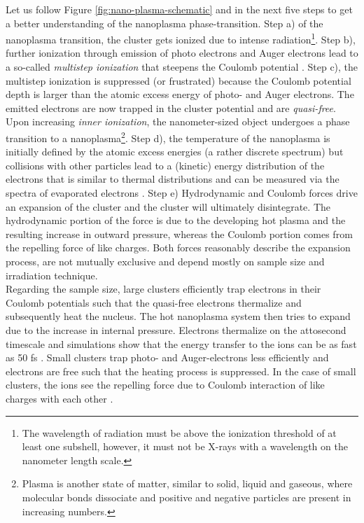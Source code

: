  Let us follow Figure \ref{fig:nano-plasma-schematic} and \citep{Arbeiter-2011-NJP,Bostedt-2010-JPB} in the next five steps to get a better understanding of the nanoplasma phase-transition. Step a) of the nanoplasma transition, the cluster gets ionized due to intense radiation\footnote{The wavelength of radiation must be above the ionization threshold of at least one subshell, however, it must not be X-rays with a wavelength on the nanometer length scale.}. Step b), further ionization through emission of photo electrons and Auger electrons lead to a so-called \textit{multistep ionization} that steepens the Coulomb potential \citep{Wabnitz-2002-Nature,Laarmann-2004-PRL,Bostedt-2008-PRL}. Step c), the multistep ionization is suppressed (or frustrated) because the Coulomb potential depth is larger than the atomic excess energy of photo- and Auger electrons. The emitted electrons are now trapped in the cluster potential and are \textit{quasi-free}. Upon increasing \textit{inner ionization}, the nanometer-sized object undergoes a phase transition to a nanoplasma\footnote{Plasma is another state of matter, similar to solid, liquid and gaseous, where molecular bonds dissociate and positive and negative particles are present in increasing numbers.}. Step d), the temperature of the nanoplasma is initially defined by the atomic excess energies (a rather discrete spectrum) but collisions with other particles lead to a (kinetic) energy distribution of the electrons that is similar to thermal distributions and can be measured via the spectra of evaporated electrons \citep{Laarmann-2005-PRL,Bostedt-2010-NJP}. Step e) Hydrodynamic and Coulomb forces drive an expansion of the cluster and the cluster will ultimately disintegrate. The hydrodynamic portion of the force is due to the developing hot plasma and the resulting increase in outward pressure, whereas the Coulomb portion comes from the repelling force of like charges. Both forces reasonably describe the expansion process, are not mutually exclusive and depend mostly on sample size and irradiation technique.\\[1\baselineskip]
Regarding the sample size, large clusters efficiently trap electrons in their Coulomb potentials such that the quasi-free electrons thermalize and subsequently heat the nucleus. The hot nanoplasma system then tries to expand due to the increase in internal pressure. Electrons thermalize on the attosecond timescale and simulations show that the energy transfer to the ions can be as fast as 50 fs \citep{Arbeiter-2010-PRA}. Small clusters trap photo- and Auger-electrons less efficiently and electrons are free such that the heating process is suppressed. In the case of small clusters, the ions see the repelling force due to Coulomb interaction of like charges with each other \citep{Lezius-1998-PRL}.\\[1\baselineskip]

